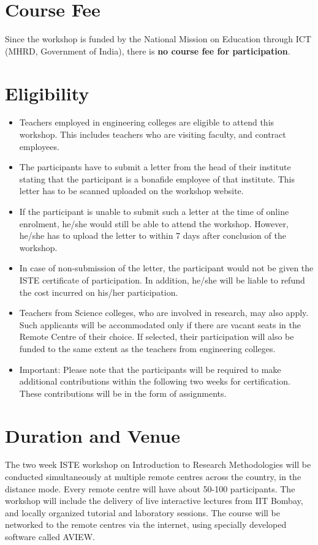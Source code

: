 \documentclass[notuble,10pt,a4paper]{leaflet}
\begin{document}
\section{{\Large Course Fee}}

Since  the  workshop  is  funded  by  the  National Mission on Education through ICT (MHRD, Government of India), there is \textbf{no course fee for participation}.

\newpage
\section{{\Large Eligibility}}

\begin{itemize}
\item Teachers employed in engineering colleges are eligible to attend this workshop. This includes teachers who are visiting faculty, and contract employees.
\item The participants have to submit a letter from the head of their institute stating that the participant is a bonafide employee of that institute. This letter has to be scanned uploaded on the workshop website. 
\item If the participant is unable to submit such a letter at the time of online enrolment, he/she would still be able to attend the workshop. However, he/she has to upload the letter to within 7 days after conclusion of the workshop. 
\item In case of non-submission of the letter, the participant would not be given the ISTE certificate of participation. In addition, he/she will be liable to refund the cost incurred on his/her participation.
\item Teachers from Science colleges, who are involved in research, may also apply. Such applicants will be accommodated only if there are vacant seats in the Remote Centre of their choice. If selected, their participation will also be funded to the same extent as the teachers from engineering colleges. 
\item Important: Please note that the participants will be required to make additional contributions 
within the following two weeks for certification. These contributions will be in the form of assignments.
\end{itemize}

\section{{\Large Duration and Venue}}
The two week ISTE workshop on Introduction to Research Methodologies will be conducted simultaneously at multiple remote centres across the country, in the distance mode. Every remote centre will have about 50-100 participants. The workshop will include the delivery of live interactive lectures from IIT Bombay, and locally organized tutorial and laboratory sessions. The course will be networked to the remote centres via the internet, using specially developed software called AVIEW.
\end{document}
